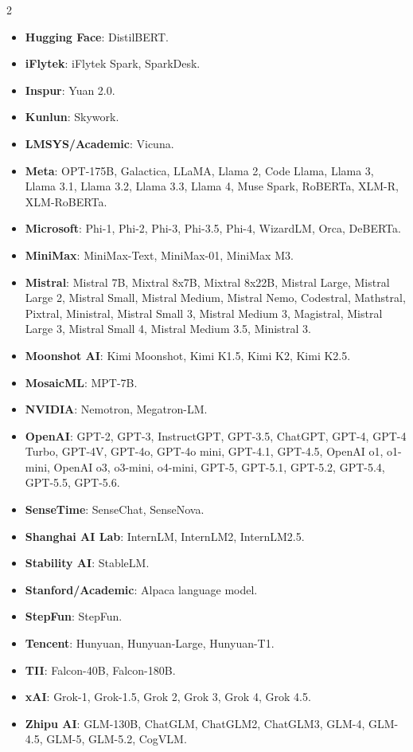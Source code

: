 \documentclass[11pt]{article}
\begin{document}
\begin{multicols}{2}
\begin{itemize}
  \item \textbf{Hugging Face}: DistilBERT.
  \item \textbf{iFlytek}: iFlytek Spark, SparkDesk.
  \item \textbf{Inspur}: Yuan 2.0.
  \item \textbf{Kunlun}: Skywork.
  \item \textbf{LMSYS/Academic}: Vicuna.
  \item \textbf{Meta}: OPT-175B, Galactica, LLaMA, Llama 2, Code Llama, Llama 3, Llama 3.1, Llama 3.2, Llama 3.3, Llama 4, Muse Spark, RoBERTa, XLM-R, XLM-RoBERTa.
  \item \textbf{Microsoft}: Phi-1, Phi-2, Phi-3, Phi-3.5, Phi-4, WizardLM, Orca, DeBERTa.
  \item \textbf{MiniMax}: MiniMax-Text, MiniMax-01, MiniMax M3.
  \item \textbf{Mistral}: Mistral 7B, Mixtral 8x7B, Mixtral 8x22B, Mistral Large, Mistral Large 2, Mistral Small, Mistral Medium, Mistral Nemo, Codestral, Mathstral, Pixtral, Ministral, Mistral Small 3, Mistral Medium 3, Magistral, Mistral Large 3, Mistral Small 4, Mistral Medium 3.5, Ministral 3.
  \item \textbf{Moonshot AI}: Kimi Moonshot, Kimi K1.5, Kimi K2, Kimi K2.5.
  \item \textbf{MosaicML}: MPT-7B.
  \item \textbf{NVIDIA}: Nemotron, Megatron-LM.
  \item \textbf{OpenAI}: GPT-2, GPT-3, InstructGPT, GPT-3.5, ChatGPT, GPT-4, GPT-4 Turbo, GPT-4V, GPT-4o, GPT-4o mini, GPT-4.1, GPT-4.5, OpenAI o1, o1-mini, OpenAI o3, o3-mini, o4-mini, GPT-5, GPT-5.1, GPT-5.2, GPT-5.4, GPT-5.5, GPT-5.6.
  \item \textbf{SenseTime}: SenseChat, SenseNova.
  \item \textbf{Shanghai AI Lab}: InternLM, InternLM2, InternLM2.5.
  \item \textbf{Stability AI}: StableLM.
  \item \textbf{Stanford/Academic}: Alpaca language model.
  \item \textbf{StepFun}: StepFun.
  \item \textbf{Tencent}: Hunyuan, Hunyuan-Large, Hunyuan-T1.
  \item \textbf{TII}: Falcon-40B, Falcon-180B.
  \item \textbf{xAI}: Grok-1, Grok-1.5, Grok 2, Grok 3, Grok 4, Grok 4.5.
  \item \textbf{Zhipu AI}: GLM-130B, ChatGLM, ChatGLM2, ChatGLM3, GLM-4, GLM-4.5, GLM-5, GLM-5.2, CogVLM.
\end{itemize}
\end{multicols}
\clearpage
\end{document}
